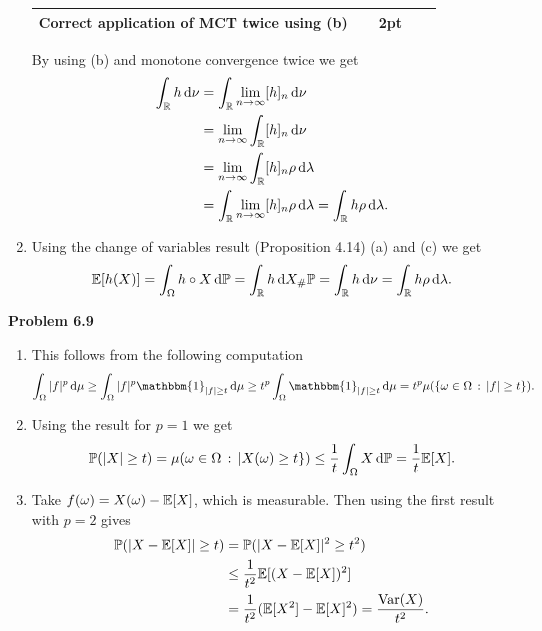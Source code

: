 \begin{enumerate}[label=(\alph*)]
{\begin{tabular}{p{0.8\linewidth}p{0.15\linewidth}}
\hline
Correct application of MCT twice using (b) & 2pt\\
\hline
\end{tabular}

} 

By using (b) and monotone convergence twice we get
\begin{align*}
	\int_\bbR h \, \dd \nu &= \int_\bbR \lim_{n \to \infty} [h]_n \, \dd \nu \\
	&= \lim_{n \to \infty} \int_\bbR [h]_n \, \dd \nu \\
	&= \lim_{n \to \infty} \int_\bbR [h]_n \rho \, \dd \lambda \\
	&= \int_\bbR \lim_{n \to \infty} [h]_n \rho \, \dd \lambda = \int_\bbR h \rho \, \dd \lambda.
\end{align*}
\item {}

Using the change of variables result (Proposition 4.14) (a) and (c) we get
\[
	\mathbb E[h(X)] = \int_\Omega h \circ X \, \mathrm{d} \mathbb P 
	= \int_{\mathbb R} h \, \mathrm{d} X_\# \mathbb P = \int_{\mathbb R} h \, \mathrm{d} \nu 
	= \int_{\mathbb R} h \rho \, \mathrm{d} \lambda.
\]
\end{enumerate}

\bigskip

\textbf{Problem 6.9}

\begin{enumerate}[label=(\alph*)]
\item This follows from the following computation
\[
	\int_\Omega |f|^p \, \dd \mu \ge \int_{\Omega} |f|^p \mathbbm{1}_{|f| \ge t} \, \dd \mu
	\ge t^p \int_\Omega \mathbbm{1}_{|f| \ge t} \, \dd \mu
	= t^p \mu(\{\omega \in \Omega \, : \, |f| \ge t\}).
\]
\item Using the result for $p = 1$ we get
\[
	\mathbb P(|X| \ge t) = \mu(\omega \in \Omega \, : \, |X(\omega) \ge t \})
	\le \frac{1}{t} \int_{\Omega} X \, \mathrm{d} \mathbb P = \frac{1}{t} \mathbb E[X].
\]
\item Take $f(\omega) = X(\omega) - \mathbb E[X]$, which is measurable. Then using the first result with $p = 2$ gives
\begin{align*}
	\mathbb P(|X - \mathbb E[X]| \ge t) &= \mathbb P(|X-\mathbb E[X]|^2 \ge t^2) \\
	&\le \frac{1}{t^2} \mathbb E[(X - \mathbb E[X])^2] \\
	&= \frac{1}{t^2} (\mathbb E[X^2] - \mathbb E[X]^2) = \frac{\mathrm{Var}(X)}{t^2}.
\end{align*}
\end{enumerate}


